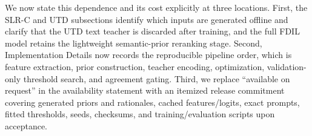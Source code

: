 {We now state this dependence and its cost explicitly at three locations. First, the SLR-C and UTD subsections identify which inputs are generated offline and clarify that the UTD text teacher is discarded after training, and the full FDIL model retains the lightweight semantic-prior reranking stage. Second, Implementation Details now records the reproducible pipeline order, which is feature extraction, prior construction, teacher encoding, optimization, validation-only threshold search, and agreement gating. Third, we replace ``available on request'' in the availability statement with an itemized release commitment covering generated priors and rationales, cached features/logits, exact prompts, fitted thresholds, seeds, checksums, and training/evaluation scripts upon acceptance.
}

